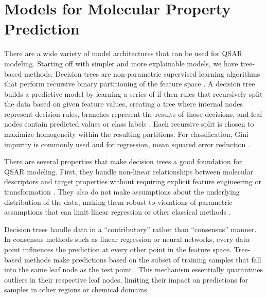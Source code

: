 \section{Models for Molecular Property Prediction}

There are a wide variety of model architectures that can be used for QSAR modeling. Starting off with simpler and more explainable models, we have tree-based methods. Decision trees are non-parametric supervised learning algorithms that perform recursive binary partitioning of the feature space \citep{Breiman1984}. A decision tree builds a predictive model by learning a series of if-then rules that recursively split the data based on given feature values, creating a tree  where internal nodes represent decision rules, branches represent the results of those decisions, and leaf nodes contain predicted values or class labels \citep{Breiman1984}. Each recursive split is chosen to maximize  homogeneity within the resulting partitions. For classification, Gini impurity is commonly used and for regression, mean squared error reduction \citep{Breiman1984}.

There are several properties that make decision trees a good foundation for QSAR modeling. First, they handle non-linear relationships between molecular descriptors and target properties without requiring explicit feature engineering or transformation \citep{Breiman1984}. They also do not make assumptions about the underlying distribution of the data, making them robust to violations of parametric assumptions that can limit linear regression or other classical methods \citep{Svetnik2003}. 

Decision trees handle data in a ``contributory'' rather than ``consensus'' manner. In consensus methods such as linear regression or neural networks, every data point influences the prediction at every other point in the feature space. Tree-based methods make predictions based on the subset of training samples that fall into the same leaf node as the test point \citep{Breiman1984}. This mechanism essentially quarantines outliers in their respective leaf nodes, limiting their impact on predictions for samples in other regions or chemical domains. 

